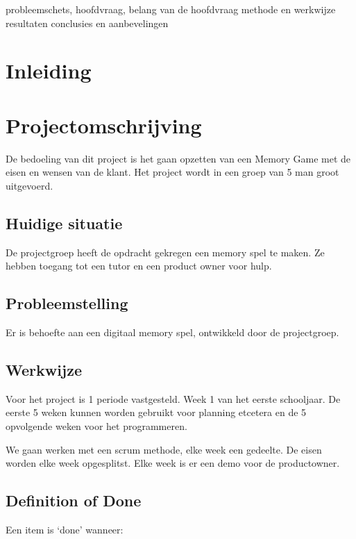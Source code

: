 \documentclass[a4paper,titlepage,11pt]{article}
\begin{document}
probleemschets, hoofdvraag, belang van de hoofdvraag
methode en werkwijze
resultaten
conclusies en aanbevelingen

\clearpage

\section{Inleiding}

\clearpage

\section{Projectomschrijving}

De bedoeling van dit project is het gaan opzetten van een Memory Game met de eisen en wensen van de klant. Het project wordt in een groep van 5 man groot uitgevoerd.

\subsection{Huidige situatie}

De projectgroep heeft de opdracht gekregen een memory spel te maken. Ze hebben toegang tot een tutor en een product owner voor hulp.

\subsection{Probleemstelling}

Er is behoefte aan een digitaal memory spel, ontwikkeld door de projectgroep.

\subsection{Werkwijze}

Voor het project is 1 periode vastgesteld. Week 1 van het eerste schooljaar. De eerste 5 weken kunnen worden gebruikt voor planning etcetera en de 5 opvolgende weken voor het programmeren.

We gaan werken met een scrum methode, elke week een gedeelte. De eisen worden elke week opgesplitst. Elke week is er een demo voor de productowner.

\subsection{Definition of Done}

Een item is `done' wanneer:
\end{document}
